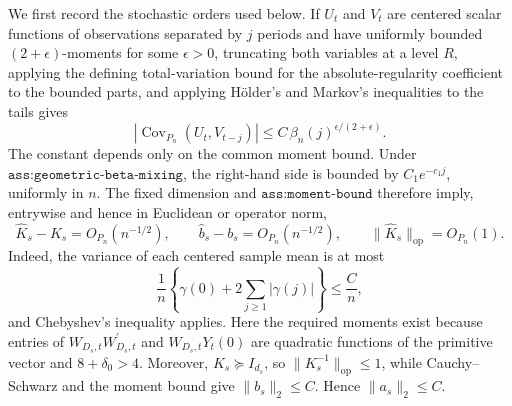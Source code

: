 We first record the stochastic orders used below.  If \(U_t\) and \(V_t\) are centered scalar functions of observations separated by \(j\) periods and have uniformly bounded \((2+\epsilon)\)-moments for some \(\epsilon>0\), truncating both variables at a level \(R\), applying the defining total-variation bound for the absolute-regularity coefficient to the bounded parts, and applying H\"older's and Markov's inequalities to the tails gives
\[
 |\operatorname{Cov}_{P_n}(U_t,V_{t-j})|
 \leq C\,\beta_n(j)^{\epsilon/(2+\epsilon)}.
\]
The constant depends only on the common moment bound.  Under \(\texttt{ass:geometric-beta-mixing}\), the right-hand side is bounded by \(C_1e^{-c_1j}\), uniformly in \(n\).  The fixed dimension and \(\texttt{ass:moment-bound}\) therefore imply, entrywise and hence in Euclidean or operator norm,
\[
 \widehat K_s-K_s=O_{P_n}(n^{-1/2}),
 \qquad
 \widehat b_s-b_s=O_{P_n}(n^{-1/2}),
 \qquad
 \lVert\widehat K_s\rVert_{\mathrm{op}}=O_{P_n}(1).
\]
Indeed, the variance of each centered sample mean is at most
\[
 \frac1n\left\{\gamma(0)+2\sum_{j\geq1}|\gamma(j)|\right\}
 \leq \frac Cn,
\]
and Chebyshev's inequality applies.  Here the required moments exist because entries of \(W_{D_s,t}W_{D_s,t}^{\prime}\) and \(W_{D_s,t}Y_t(0)\) are quadratic functions of the primitive vector and \(8+\delta_0>4\).  Moreover, \(K_s\succeq I_{d_s}\), so \(\lVert K_s^{-1}\rVert_{\mathrm{op}}\leq1\), while Cauchy--Schwarz and the moment bound give \(\lVert b_s\rVert_2\leq C\).  Hence \(\lVert a_s\rVert_2\leq C\).

